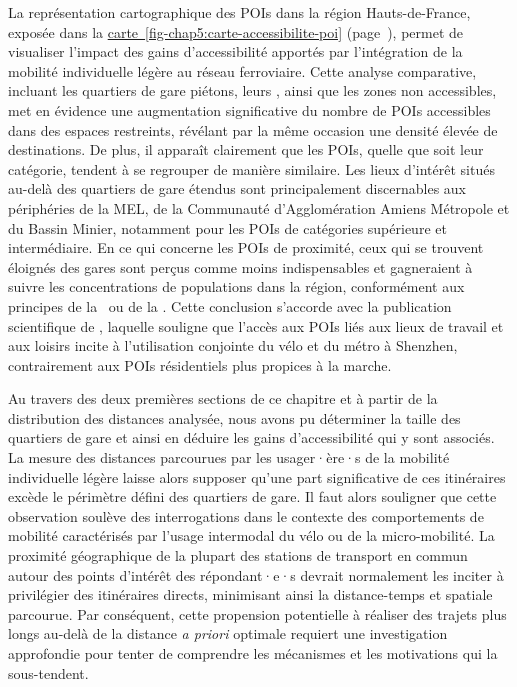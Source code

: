 \begin{refsegment}
La représentation cartographique des \acrshort{POIs} dans la région Hauts-de-France, exposée dans la \hyperref[fig-chap5:carte-accessibilite-poi]{carte~\ref{fig-chap5:carte-accessibilite-poi}} (page~\pageref{fig-chap5:carte-accessibilite-poi}), permet de visualiser l'impact des gains d'accessibilité apportés par l'intégration de la mobilité individuelle légère au réseau ferroviaire. Cette analyse comparative, incluant les quartiers de gare piétons, leurs , ainsi que les zones non accessibles, met en évidence une augmentation significative du nombre de \acrshort{POIs} accessibles dans des espaces restreints, révélant par la même occasion une densité élevée de destinations. De plus, il apparaît clairement que les \acrshort{POIs}, quelle que soit leur catégorie, tendent à se regrouper de manière similaire. Les lieux d'intérêt situés au-delà des quartiers de gare étendus sont principalement discernables aux périphéries de la \acrshort{MEL}, de la Communauté d'Agglomération Amiens Métropole et du Bassin Minier, notamment pour les \acrshort{POIs} de catégories supérieure et intermédiaire. En ce qui concerne les \acrshort{POIs} de proximité, ceux qui se trouvent éloignés des gares sont perçus comme moins indispensables et gagneraient à suivre les concentrations de populations dans la région, conformément aux principes de la ~ou de la . Cette conclusion s'accorde avec la publication scientifique de \textcolor{blue}{\textcite[12]{wu_measuring_2019}}, laquelle souligne que l'accès aux \acrshort{POIs} liés aux lieux de travail et aux loisirs incite à l'utilisation conjointe du vélo et du métro à Shenzhen, contrairement aux \acrshort{POIs} résidentiels plus propices à la marche.%

Au travers des deux premières sections de ce chapitre et à partir de la distribution des distances analysée, nous avons pu déterminer la taille des quartiers de gare et ainsi en déduire les gains d'accessibilité qui y sont associés. La mesure des distances parcourues par les usager·ère·s de la mobilité individuelle légère laisse alors supposer qu'une part significative de ces itinéraires excède le périmètre défini des quartiers de gare. Il faut alors souligner que cette observation soulève des interrogations dans le contexte des comportements de mobilité caractérisés par l'usage intermodal du vélo ou de la micro-mobilité. La proximité géographique de la plupart des stations de transport en commun autour des points d'intérêt des répondant·e·s devrait normalement les inciter à privilégier des itinéraires directs, minimisant ainsi la distance-temps et spatiale parcourue. Par conséquent, cette propension potentielle à réaliser des trajets plus longs au-delà de la distance \textsl{a priori} optimale requiert une investigation approfondie pour tenter de comprendre les mécanismes et les motivations qui la sous-tendent.%


\end{refsegment}
